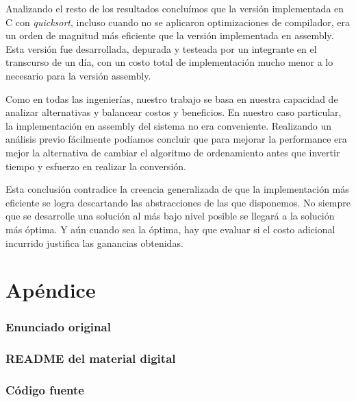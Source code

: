 \documentclass[a4paper,11pt]{article}
\begin{document}
Analizando el resto de los resultados concluímos que la versión implementada en
C con \textit{quicksort}, incluso cuando no se aplicaron optimizaciones de
compilador, era un orden de magnitud más eficiente que la versión implementada
en assembly. Esta versión fue desarrollada, depurada y testeada por un
integrante en el transcurso de un día, con un costo total de implementación
mucho menor a lo necesario para la versión assembly.

Como en todas las ingenierías, nuestro trabajo se basa en nuestra capacidad de
analizar alternativas y balancear costos y beneficios. En nuestro caso
particular, la implementación en assembly del sistema no era conveniente.
Realizando un análisis previo fácilmente podíamos concluir que para mejorar la
performance era mejor la alternativa de cambiar el algoritmo de ordenamiento
antes que invertir tiempo y esfuerzo en realizar la conversión.

Esta conclusión contradice la creencia generalizada de que la implementación
más eficiente se logra descartando las abstracciones de las que disponemos. No
siempre que se desarrolle una solución al más bajo nivel posible se llegará a
la solución más óptima. Y aún cuando sea la óptima, hay que evaluar si el costo
adicional incurrido justifica las ganancias obtenidas.

\clearpage

\part{Apéndice}
\appendix

\section{Enunciado original}\label{sec:enunciado}


\clearpage
\section{README del material digital}\label{sec:readme}


\clearpage
\section{Código fuente}\label{sec:source}
\clearpage
{}



\end{document}
